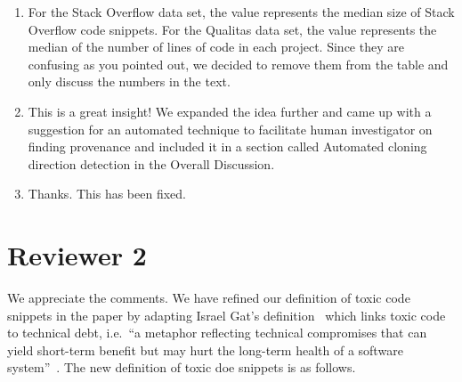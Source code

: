 \documentclass[a4paper,twoside,10pt]{reviewresponse}
\begin{document}
\begin{enumerate} 
	\item For the Stack Overflow data set, the value represents
	the median size of Stack Overflow code snippets. For the Qualitas data set, the
	value represents the median of the number of lines of code in each project. Since
	they are confusing as you pointed out, we decided to remove them from the table
	and only discuss the numbers in the text. 
	\item This is a great insight! We expanded the idea further and came up with a suggestion for an
	automated technique to facilitate human investigator on finding provenance and
	included it in a section called Automated cloning direction detection in the
	Overall Discussion. 
	\item Thanks. This has been fixed. \end{enumerate}

\section{Reviewer 2}


We appreciate the comments. We have refined our definition of toxic code
snippets in the paper by adapting Israel Gat's definition~\citep{toxiccode}
which links toxic code to technical debt, i.e.~``a metaphor reflecting technical
compromises that can yield short-term benefit but may hurt the long-term health
of a software system''~\citep{Li2015}. The new definition of toxic doe snippets
is as follows.
\end{document}
